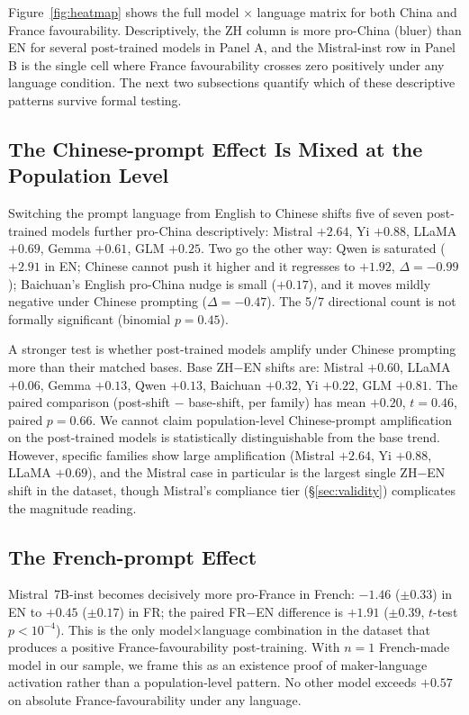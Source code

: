 \documentclass[letterpaper]{article} %
\begin{document}
Figure~\ref{fig:heatmap} shows the full model $\times$ language matrix for both China and France favourability. Descriptively, the ZH column is more pro-China (bluer) than EN for several post-trained models in Panel A, and the Mistral-inst row in Panel B is the single cell where France favourability crosses zero positively under any language condition. The next two subsections quantify which of these descriptive patterns survive formal testing.

\subsection{The Chinese-prompt Effect Is Mixed at the Population Level}

Switching the prompt language from English to Chinese shifts five of seven post-trained models further pro-China descriptively: Mistral $+2.64$, Yi $+0.88$, LLaMA $+0.69$, Gemma $+0.61$, GLM $+0.25$. Two go the other way: Qwen is saturated ($+2.91$ in EN; Chinese cannot push it higher and it regresses to $+1.92$, $\Delta = -0.99$); Baichuan's English pro-China nudge is small ($+0.17$), and it moves mildly negative under Chinese prompting ($\Delta = -0.47$). The 5/7 directional count is not formally significant (binomial $p = 0.45$).

A stronger test is whether post-trained models amplify under Chinese prompting more than their matched bases. Base ZH$-$EN shifts are: Mistral $+0.60$, LLaMA $+0.06$, Gemma $+0.13$, Qwen $+0.13$, Baichuan $+0.32$, Yi $+0.22$, GLM $+0.81$. The paired comparison (post-shift $-$ base-shift, per family) has mean $+0.20$, $t = 0.46$, paired $p = 0.66$. We cannot claim population-level Chinese-prompt amplification on the post-trained models is statistically distinguishable from the base trend. However, specific families show large amplification (Mistral $+2.64$, Yi $+0.88$, LLaMA $+0.69$), and the Mistral case in particular is the largest single ZH$-$EN shift in the dataset, though Mistral's compliance tier (\S\ref{sec:validity}) complicates the magnitude reading.

\subsection{The French-prompt Effect}

Mistral~7B-inst becomes decisively more pro-France in French: $-1.46$ ($\pm 0.33$) in EN to $+0.45$ ($\pm 0.17$) in FR; the paired FR$-$EN difference is $+1.91$ ($\pm 0.39$, $t$-test $p < 10^{-4}$). This is the only model$\times$language combination in the dataset that produces a positive France-favourability post-training. With $n = 1$ French-made model in our sample, we frame this as an existence proof of maker-language activation rather than a population-level pattern. No other model exceeds $+0.57$ on absolute France-favourability under any language.
\end{document}
